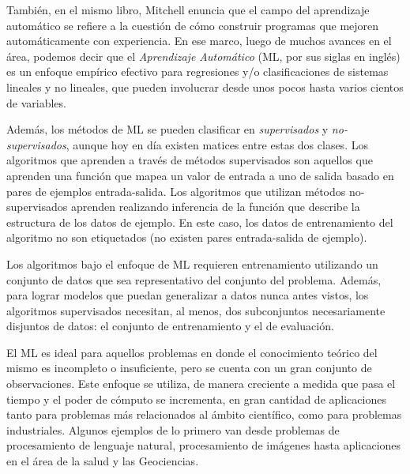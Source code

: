       También, en el mismo libro, Mitchell enuncia que el campo del aprendizaje
      automático se refiere a la cuestión de cómo construir programas
      que mejoren automáticamente con experiencia.
      En ese marco, luego de muchos avances en el área, podemos decir que el
      \textit{Aprendizaje Automático} (ML, por sus siglas en inglés) es un
      enfoque empírico efectivo para regresiones y/o clasificaciones de sistemas
      lineales y no lineales, que pueden involucrar desde unos pocos hasta varios
      cientos de variables.

    \par Además, los métodos de ML se pueden clasificar en
      \textit{supervisados}\cite{supervised_learning} y
      \textit{no-supervisados}\cite{unsupervised_learning}, aunque hoy en día
      existen matices entre estas dos clases\cite{semi_supervised}.
      Los algoritmos que aprenden a través de métodos supervisados son aquellos que
      aprenden una función que mapea un valor de entrada a uno de salida basado
      en pares de ejemplos entrada-salida.
      Los algoritmos que utilizan métodos no-supervisados aprenden
      realizando inferencia de la función que describe la estructura de los datos
      de ejemplo. En este caso, los datos de entrenamiento del algoritmo no son
      etiquetados (no existen pares entrada-salida de ejemplo).

    \par Los algoritmos bajo el enfoque de ML requieren entrenamiento utilizando un
      conjunto de datos que sea representativo del conjunto del problema.
      Además, para lograr modelos que puedan generalizar a datos nunca antes vistos,
      los algoritmos supervisados necesitan, al menos, dos subconjuntos necesariamente
      disjuntos de datos: el conjunto de entrenamiento y el de evaluación\cite{test_val}.


    \par El ML es ideal para aquellos problemas en donde el conocimiento teórico del mismo
      es incompleto o insuficiente, pero se cuenta con un gran conjunto de observaciones.
      Este enfoque se utiliza, de manera creciente a medida que pasa el tiempo y
      el poder de cómputo se incrementa, en gran cantidad de aplicaciones tanto para
      problemas más relacionados al ámbito científico, como para problemas
      industriales. Algunos ejemplos de lo primero van desde problemas de
      procesamiento de lenguaje
      natural\cite{twitt_nlp, cardellino, svm_semantic}, procesamiento de
      imágenes\cite{face_detection, corner_detection, handwritting} hasta aplicaciones
      en el área de la salud\cite{nutrition_prediction, bigdata_health, age_estimation, children}
      y las Geociencias\cite{solar_irradiation, ml_grs, modeling_mineral}.

